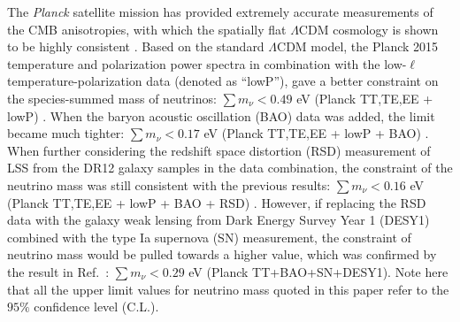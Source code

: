 \documentclass[aps,prd,nofootinbib,amsmath,amssymb,twocolumn,superscriptaddress,10pt]{revtex4}%
\begin{document}
The {\it Planck} satellite mission has provided extremely accurate measurements of the CMB anisotropies, with which the spatially flat $\Lambda$CDM cosmology is shown to be highly consistent \cite{Ade:2013zuv,Ade:2015xua}. Based on the standard $\Lambda$CDM model, the Planck 2015 temperature and polarization power spectra in combination with the low-$\ell$ temperature-polarization data (denoted as ``lowP''), gave a better constraint on the species-summed mass of neutrinos: $\sum m_\nu<0.49$ eV (Planck TT,TE,EE + lowP) \cite{Ade:2015xua}. When the baryon acoustic oscillation (BAO) data was added, the limit became much tighter: $\sum m_\nu<0.17$ eV (Planck TT,TE,EE + lowP + BAO) \cite{Ade:2015xua}. When further considering the redshift space distortion (RSD) measurement of LSS from the DR12 galaxy samples in the data combination, the constraint of the neutrino mass was still consistent with the previous results: $\sum m_\nu<0.16$ eV (Planck TT,TE,EE + lowP + BAO + RSD) \cite{Alam:2016hwk}. However, if replacing the RSD data with the galaxy weak lensing from Dark Energy Survey Year 1 (DESY1) combined with the type Ia supernova (SN) measurement, the constraint of neutrino mass would be pulled towards a higher value, which was confirmed by the result in Ref.~\cite{Abbott:2017wau}: $\sum m_\nu<0.29$ eV (Planck TT+BAO+SN+DESY1). Note here that all the upper limit values for neutrino mass quoted in this paper refer to the $95\%$ confidence level (C.L.). 
\end{document}
